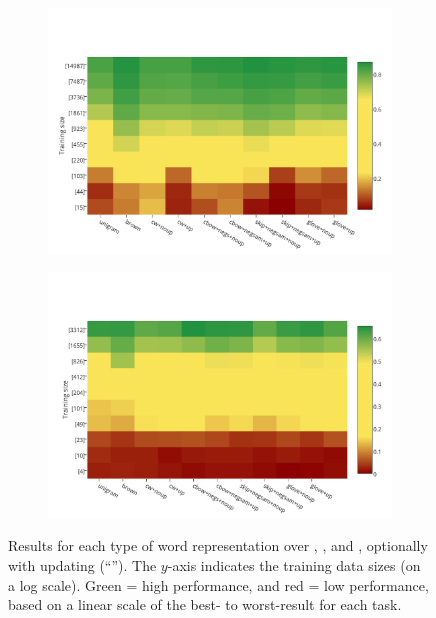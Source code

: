\begin{figure}[t!]
\begin{subfigure}{7cm}
    \includegraphics[scale=0.38]{map-ner-color-invert}    	
	\subcaption{\ner (\fscore)}	
	\label{ner}
\end{subfigure}
\begin{subfigure}{7cm}
	\centering
    \includegraphics[scale=0.38]{map-mwe-color-invert}
	\subcaption{\mwe (\fscore)}		
	\label{mwe}
\end{subfigure}
\caption{Results for each type of word representation over \pos, \chunking, \ner and
  \mwe, optionally with updating (``\withup''). The $y$-axis indicates the training data
  sizes (on a log scale). Green = high performance, and red = low
  performance, based on a linear scale of the best- to worst-result for
  each task. }
\label{fig:heatmaps}
\end{figure}

